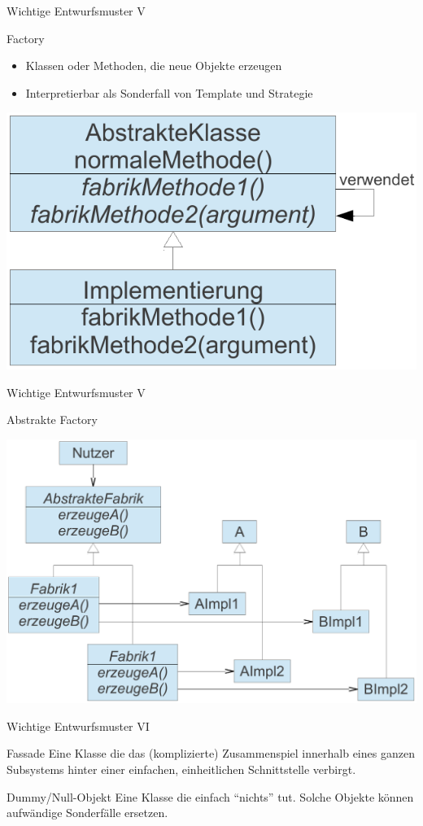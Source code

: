 \begin{frame}{Wichtige Entwurfsmuster V}	
	\begin{block}{Factory}
		\begin{itemize}
			\item Klassen oder Methoden, die neue Objekte erzeugen
			\item Interpretierbar als Sonderfall von Template und Strategie
		\end{itemize}		
		\vspace{-1em}
		\begin{center}
			\includegraphics[width=0.6\linewidth]{images/factorymethod.pdf}
		\end{center}		
	\end{block}
\end{frame}

\begin{frame}{Wichtige Entwurfsmuster V}	
	\begin{block}{Abstrakte Factory}
		\begin{center}
			\includegraphics[width=0.85\linewidth]{images/factory.pdf}
		\end{center}		
	\end{block}
\end{frame}

\begin{frame}{Wichtige Entwurfsmuster VI}
	\begin{block}{Fassade}
		Eine Klasse die das (komplizierte) Zusammenspiel innerhalb eines ganzen Subsystems hinter einer einfachen, einheitlichen Schnittstelle verbirgt.
	\end{block}
	
	\begin{block}{Dummy/Null-Objekt}
		Eine Klasse die einfach \enquote{nichts} tut. Solche Objekte können aufwändige Sonderfälle ersetzen.
	\end{block}
\end{frame}

